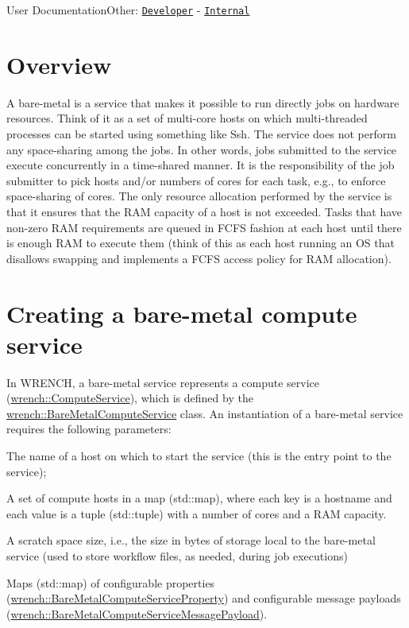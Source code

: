 User DocumentationOther\+: \href{../developer/guide-baremetal.html}{\tt Developer} -\/ \href{../internal/guide-baremetal.html}{\tt Internal}\hypertarget{guide-baremetal_guide-baremetal-overview}{}\section{Overview}\label{guide-baremetal_guide-baremetal-overview}
A bare-\/metal is a service that makes it possible to run directly jobs on hardware resources. Think of it as a set of multi-\/core hosts on which multi-\/threaded processes can be started using something like Ssh. The service does not perform any space-\/sharing among the jobs. In other words, jobs submitted to the service execute concurrently in a time-\/shared manner. It is the responsibility of the job submitter to pick hosts and/or numbers of cores for each task, e.\+g., to enforce space-\/sharing of cores. The only resource allocation performed by the service is that it ensures that the R\+AM capacity of a host is not exceeded. Tasks that have non-\/zero R\+AM requirements are queued in F\+C\+FS fashion at each host until there is enough R\+AM to execute them (think of this as each host running an OS that disallows swapping and implements a F\+C\+FS access policy for R\+AM allocation).\hypertarget{guide-baremetal_guide-baremetal-creating}{}\section{Creating a bare-\/metal compute service}\label{guide-baremetal_guide-baremetal-creating}
In W\+R\+E\+N\+CH, a bare-\/metal service represents a compute service ({\ttfamily \hyperlink{classwrench_1_1_compute_service}{wrench\+::\+Compute\+Service}}), which is defined by the {\ttfamily \hyperlink{classwrench_1_1_bare_metal_compute_service}{wrench\+::\+Bare\+Metal\+Compute\+Service}} class. An instantiation of a bare-\/metal service requires the following parameters\+:


\begin{DoxyItemize}
\item The name of a host on which to start the service (this is the entry point to the service);
\item A set of compute hosts in a map ({\ttfamily std\+::map}), where each key is a hostname and each value is a tuple ({\ttfamily std\+::tuple}) with a number of cores and a R\+AM capacity.
\item A scratch space size, i.\+e., the size in bytes of storage local to the bare-\/metal service (used to store workflow files, as needed, during job executions)
\item Maps ({\ttfamily std\+::map}) of configurable properties ({\ttfamily \hyperlink{classwrench_1_1_bare_metal_compute_service_property}{wrench\+::\+Bare\+Metal\+Compute\+Service\+Property}}) and configurable message payloads ({\ttfamily \hyperlink{classwrench_1_1_bare_metal_compute_service_message_payload}{wrench\+::\+Bare\+Metal\+Compute\+Service\+Message\+Payload}}).
\end{DoxyItemize}

